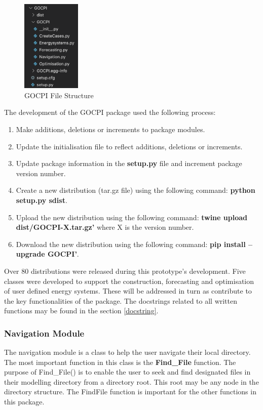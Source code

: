 \documentclass[12pt]{article}
\begin{document}
\begin{figure}
	\centering
	\includegraphics[width = 0.25\textwidth]{GOCPI-package-structure}
	\caption{GOCPI File Structure}
	\label{fig:GPS}
\end{figure}

The development of the GOCPI package used the following process:
\begin{enumerate}
	\item Make additions, deletions or increments to package modules.
	\item Update the initialisation file to reflect additions, deletions or increments.
	\item Update package information in the \textbf{setup.py} file and increment package version number.
	\item Create a new distribution (tar.gz file) using the following command: \textbf{python setup.py sdist}.
	\item Upload the new distribution using the following command: \textbf{twine upload dist/GOCPI-X.tar.gz'} where X is the version number.
	\item Download the new distribution using the following command: \textbf{pip install --upgrade GOCPI'}.
\end{enumerate}

Over 80 distributions were released during this prototype's development. 
Five classes were developed to support the construction, forecasting and optimisation of user defined energy systems.
These will be addressed in turn as contribute to the key functionalities of the package.
The docstrings related to all written functions may be found in the section \ref{docstring}.

\subsubsection{Navigation Module}
The navigation module is a class to help the user navigate their local directory. 
The most important function in this class is the \textbf{Find\_File} function.
The purpose of Find\_File() is to enable the user to seek and find designated files in their modelling directory from a directory root.
This root may be any node in the directory structure. 
The FindFile function is important for the other functions in this package.
\end{document}
